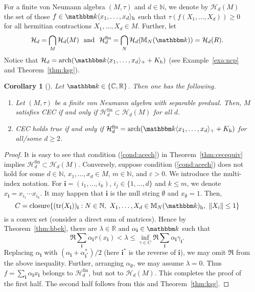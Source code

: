 \documentclass[12pt]{amsart}
\newtheorem{cor}[thm]{Corollary}
\theoremstyle{definition}
\begin{document}
For a finite von Neumann algebra $(M,\tau)$ and $d\in{{\mathbb N}}$, we denote by
${{\mathcal H}}_d(M)$ the set of those $f \in {{\mathbbm k}}\langle x_1,\ldots,x_d\rangle_{\mathrm{h}}$
such that $\tau(f(X_1,\ldots,X_d))\geq0$ for all
hermitian contractions $X_1,\ldots,X_d\in M$.
Further, let
\[
{{\mathcal H}}_d=\bigcap_M {{\mathcal H}}_d(M)
\ \mbox{ and }\
{{\mathcal H}}_d^{\mathrm{fin}}=\bigcap_N{{\mathcal H}}_d({{\mathbb M}}_N({{\mathbbm k}}))={{\mathcal H}}_d(R).
\]
Notice that ${{\mathcal H}}_d=\operatorname*{arch}({{\mathbbm k}}\langle x_1,\ldots,x_d\rangle_+ + K_{\mathrm{h}})$
(see Example~\ref{exa:ncp} and Theorem~\ref{thm:ksg}).

\begin{cor}[\cite{ks}]
Let ${{\mathbbm k}}\in\{{{\mathbb C}},{{\mathbb R}}\}$. Then one has the following.
\begin{enumerate}[$\bullet$]
\item
Let $(M,\tau)$ be a finite von Neumann algebra with separable predual.
Then, $M$ satisfies CEC if and only if ${{\mathcal H}}_d^{\mathrm{fin}}\subset{{\mathcal H}}_d(M)$ for all $d$.
\item
CEC holds true if and only if
${{\mathcal H}}_d^{\mathrm{fin}}=\operatorname*{arch}({{\mathbbm k}}\langle x_1,\ldots,x_d\rangle_+ + K_{\mathrm{h}})$
for all/some $d\geq2$.
\end{enumerate}
\end{cor}
\begin{proof}
It is easy to see that condition (\ref{cond:acech}) in Theorem~\ref{thm:cecequiv}
implies ${{\mathcal H}}_d^{\mathrm{fin}}\subset{{\mathcal H}}_d(M)$.
Conversely, suppose condition (\ref{cond:acech}) does not hold
for some $d\in{{\mathbb N}}$, $x_1,\ldots,x_d\in M$, $m\in{{\mathbb N}}$, and ${\varepsilon}>0$.
We introduce the multi-index notation. For ${\mathbf i}=(i_1,\ldots,i_k)$,
$i_j\in\{1,\ldots,d\}$ and $k\le m$, we denote $x_{\mathbf i}=x_{i_1}\cdots x_{i_k}$.
It may happen that ${\mathbf i}$ is the null string $\emptyset$ and $x_\emptyset=1$.
Then,
\[
C=\mathrm{closure}\{(\operatorname*{tr}(X_{\mathbf i}))_{\mathbf i} : N\in{{\mathbb N}},\ X_1,\ldots,X_d\in{{\mathbb M}}_N({{\mathbbm k}})_{\mathrm{h}},\ \|X_i\|\le1\}
\]
is a convex set (consider a direct sum of matrices).
Hence by Theorem~\ref{thm:hbek}, there are $\lambda\in{{\mathbb R}}$
and $\alpha_{\mathbf i}\in{{\mathbbm k}}$ such that
\[
\Re\sum_{\mathbf i}\alpha_{\mathbf i}\tau(x_{\mathbf i}) < \lambda
\le \inf_{\gamma\in C} \Re \sum_{\mathbf i}\alpha_{\mathbf i}\gamma_{\mathbf i}.
\]
Replacing $\alpha_{\mathbf i}$ with $(\alpha_{\mathbf i}+\alpha_{{\mathbf i}^*}^*)/2$ (here ${\mathbf i}^*$
is the reverse of ${\mathbf i}$), we may omit $\Re$ from the above inequality.
Further, arranging $\alpha_{\emptyset}$, we may assume $\lambda=0$.
Thus $f=\sum_{\mathbf i}\alpha_{\mathbf i}x_{\mathbf i}$ belongs to ${{\mathcal H}}_d^{\mathrm{fin}}$, but not to ${{\mathcal H}}_d(M)$.
This completes the proof of the first half.
The second half follows from this and Theorem~\ref{thm:ksg}.
\end{proof}
\end{document}
